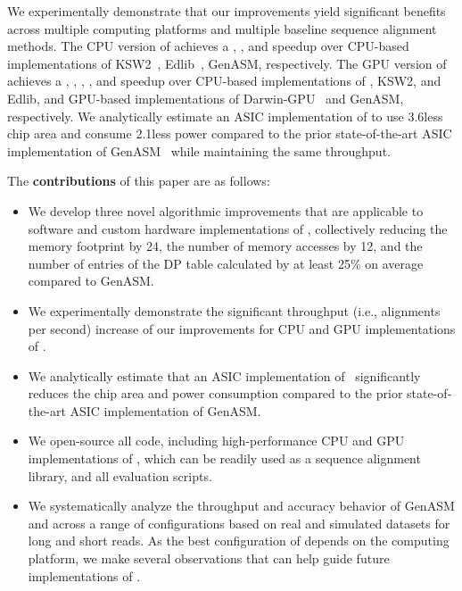 We experimentally demonstrate that our improvements yield significant benefits across multiple computing platforms and multiple baseline sequence alignment methods. The CPU version of \toolname achieves a \kswcpuspeedup, \edlibcpuspeedup, and \cpuoptspeedup speedup over CPU-based implementations of KSW2~\citep{ksw2_a,ksw2_b}, Edlib~\citep{edlib}, GenASM, respectively. The GPU version of \toolname achieves a \cpugpuspeedup, \kswgpuspeedup, \edlibgpuspeedup, \darwingpuspeedup, and \gpuoptspeedup speedup over CPU-based implementations of \toolname, KSW2, and Edlib, and GPU-based implementations of Darwin-GPU~\citep{ahmed2020darwin_gpu} and GenASM, respectively. We analytically estimate an ASIC implementation of \toolname to use 3.6\x less chip area and consume 2.1\x less power compared to the prior state-of-the-art ASIC implementation of GenASM~\citep{cali2020genasm} while maintaining the same throughput.

The \textbf{contributions} of this paper are as follows:
\begin{itemize}
    \item We develop three novel algorithmic improvements that are applicable to software and custom hardware implementations of \toolname, collectively reducing the memory footprint by 24\x, the number of memory accesses by 12\x, and the number of entries of the DP table calculated by at least 25\% on average compared to GenASM.
    \item We experimentally demonstrate the significant throughput (i.e., alignments per second) increase of our improvements for CPU and GPU implementations of \toolname.
    \item We analytically estimate that an ASIC implementation of \toolname\ significantly reduces the chip area and power consumption compared to the prior state-of-the-art ASIC implementation of GenASM.
    \item We open-source all code, including high-performance CPU and GPU implementations of \toolname, which can be readily used as a sequence alignment library, and all evaluation scripts.
    \item We systematically analyze the throughput and accuracy behavior of GenASM and \toolname across a range of configurations based on real and simulated datasets for long and short reads. As the best configuration of \toolname depends on the computing platform, we make several observations that can help guide future implementations of \toolname.
\end{itemize}
